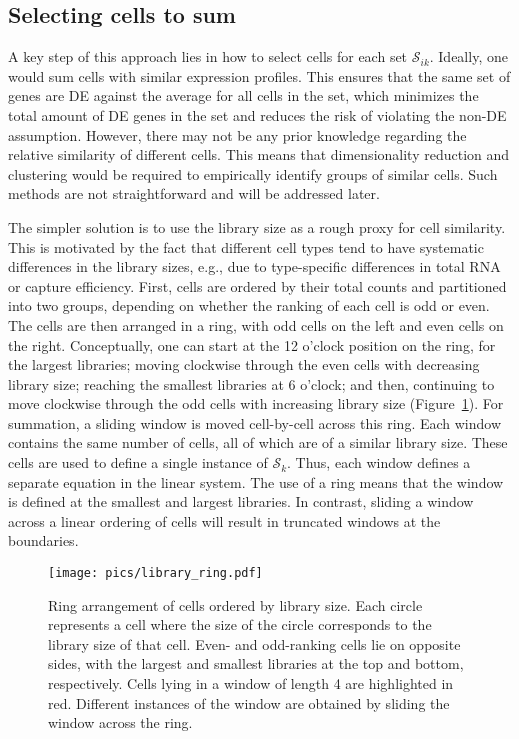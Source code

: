 \documentclass{article}
\begin{document}
\subsection{Selecting cells to sum}
A key step of this approach lies in how to select cells for each set $\mathcal{S}_{ik}$.
Ideally, one would sum cells with similar expression profiles.
This ensures that the same set of genes are DE against the average for all cells in the set,
    which minimizes the total amount of DE genes in the set and reduces the risk of violating the non-DE assumption.
However, there may not be any prior knowledge regarding the relative similarity of different cells.
This means that dimensionality reduction and clustering would be required to empirically identify groups of similar cells.
Such methods are not straightforward and will be addressed later.

The simpler solution is to use the library size as a rough proxy for cell similarity.
This is motivated by the fact that different cell types tend to have systematic differences in the library sizes, 
    e.g., due to type-specific differences in total RNA or capture efficiency.
First, cells are ordered by their total counts and partitioned into two groups, depending on whether the ranking of each cell is odd or even.
The cells are then arranged in a ring, with odd cells on the left and even cells on the right.
Conceptually, one can start at the 12 o'clock position on the ring, for the largest libraries; moving clockwise through the even cells with decreasing library size;
reaching the smallest libraries at 6 o'clock; and then, continuing to move clockwise through the odd cells with increasing library size (Figure~\ref{fig:library_ring}).
For summation, a sliding window is moved cell-by-cell across this ring.
Each window contains the same number of cells, all of which are of a similar library size.
These cells are used to define a single instance of $\mathcal{S}_{k}$.
Thus, each window defines a separate equation in the linear system.
The use of a ring means that the window is defined at the smallest and largest libraries.
In contrast, sliding a window across a linear ordering of cells will result in truncated windows at the boundaries.

\begin{figure}[bt]
    \begin{center}
        \texttt{[image: pics/library\_ring.pdf]}
    \end{center}
    \caption{
        Ring arrangement of cells ordered by library size.
        Each circle represents a cell where the size of the circle corresponds to the library size of that cell.
        Even- and odd-ranking cells lie on opposite sides, with the largest and smallest libraries at the top and bottom, respectively.
        Cells lying in a window of length 4 are highlighted in red.
        Different instances of the window are obtained by sliding the window across the ring.
    }
    \label{fig:library_ring}
\end{figure}
\end{document}
